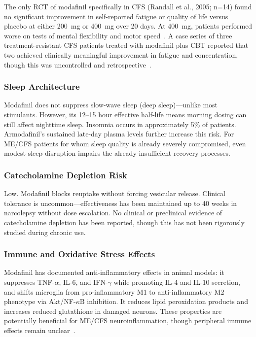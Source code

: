 The only RCT of modafinil specifically in CFS (Randall et al., 2005; n=14) found no significant improvement in self-reported fatigue or quality of life versus placebo at either 200~mg or 400~mg over 20 days. At 400~mg, patients performed worse on tests of mental flexibility and motor speed~\cite{Randall2005modafinil}. A case series of three treatment-resistant CFS patients treated with modafinil plus CBT reported that two achieved clinically meaningful improvement in fatigue and concentration, though this was uncontrolled and retrospective~\cite{Sugino2021modafinilCBTcfs}.

\subsubsection{Sleep Architecture}

Modafinil does not suppress slow-wave sleep (deep sleep)---unlike most stimulants. However, its 12--15 hour effective half-life means morning dosing can still affect nighttime sleep. Insomnia occurs in approximately 5\% of patients. Armodafinil's sustained late-day plasma levels further increase this risk. For ME/CFS patients for whom sleep quality is already severely compromised, even modest sleep disruption impairs the already-insufficient recovery processes.

\subsubsection{Catecholamine Depletion Risk}

Low. Modafinil blocks reuptake without forcing vesicular release. Clinical tolerance is uncommon---effectiveness has been maintained up to 40 weeks in narcolepsy without dose escalation. No clinical or preclinical evidence of catecholamine depletion has been reported, though this has not been rigorously studied during chronic use.

\subsubsection{Immune and Oxidative Stress Effects}

Modafinil has documented anti-inflammatory effects in animal models: it suppresses TNF-$\alpha$, IL-6, and IFN-$\gamma$ while promoting IL-4 and IL-10 secretion, and shifts microglia from pro-inflammatory M1 to anti-inflammatory M2 phenotype via Akt/NF-$\kappa$B inhibition. It reduces lipid peroxidation products and increases reduced glutathione in damaged neurons. These properties are potentially beneficial for ME/CFS neuroinflammation, though peripheral immune effects remain unclear~\cite{Minzenberg2008modafinil}.

